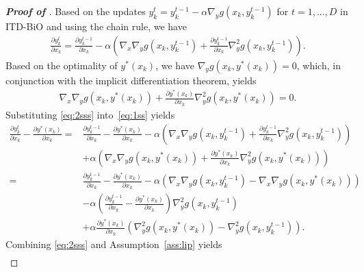 \documentclass{osudissert96}
\begin{document}
\begin{proof}[\bf Proof of ]
Based on the updates $y_k^t = y_k^{t-1}-\alpha \nabla_y g(x_k,y_k^{t-1}) $ for $t=1,...,D$  in ITD-BiO and using the chain rule, we have 
\begin{align}\label{eq:1ss}
\frac{\partial y_k^t}{\partial x_k} = \frac{\partial y_k^{t-1}}{\partial x_k} - \alpha \left( \nabla_x\nabla_y g(x_k,y_k^{t-1}) +\frac{\partial y_k^{t-1}}{\partial x_k}\nabla_y^2 g(x_k,y_k^{t-1})\right).
\end{align}
Based on the optimality of $y^*(x_k)$, we have $\nabla_y g(x_k,y^*(x_k))=0$, which, in conjunction with the implicit differentiation theorem, yields
\begin{align}\label{eq:2sss}
\nabla_x\nabla_y g(x_k,y^*(x_k)) + \frac{\partial y^*(x_k)}{\partial x_k}\nabla_y^2 g(x_k,y^*(x_k))=0.
\end{align}
Substituting \cref{eq:2sss} into~\cref{eq:1ss} yields
\begin{align}\label{eq:zhaoposdo}
\frac{\partial y_k^t}{\partial x_k} -\frac{\partial y^*(x_k)}{\partial x_k} =& \frac{\partial y_k^{t-1}}{\partial x_k} -\frac{\partial y^*(x_k)}{\partial x_k}- \alpha \left( \nabla_x\nabla_y g(x_k,y_k^{t-1}) +\frac{\partial y_k^{t-1}}{\partial x_k}\nabla_y^2 g(x_k,y_k^{t-1})\right) \nonumber
\\&+\alpha\left( \nabla_x\nabla_y g(x_k,y^*(x_k)) + \frac{\partial y^*(x_k)}{\partial x_k}\nabla_y^2 g(x_k,y^*(x_k)) \right) \nonumber
\\ = &\frac{\partial y_k^{t-1}}{\partial x_k} -\frac{\partial y^*(x_k)}{\partial x_k}- \alpha \left( \nabla_x\nabla_y g(x_k,y_k^{t-1}) - \nabla_x\nabla_y g(x_k,y^*(x_k))\right) \nonumber
\\&-\alpha\left(\frac{\partial y_k^{t-1}}{\partial x_k}- \frac{\partial y^*(x_k)}{\partial x_k}\right)\nabla_y^2 g(x_k,y_k^{t-1}) \nonumber
\\&+\alpha\frac{\partial y^*(x_k)}{\partial x_k}\left(\nabla_y^2 g(x_k,y^*(x_k))-\nabla_y^2 g(x_k,y_k^{t-1})   \right). 
\end{align}
Combining \cref{eq:2sss} and Assumption~\ref{ass:lip} yields
\begin{align}\label{ggpdas}

\end{align}
\end{proof}
\end{document}
